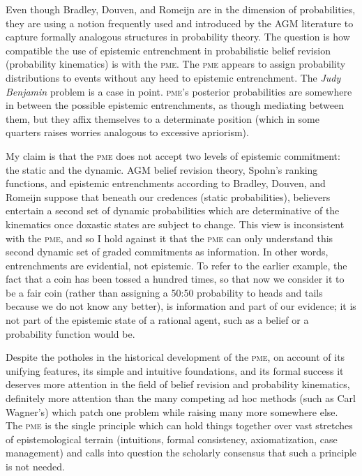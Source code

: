 \documentclass[11pt]{article}
\begin{document}
Even though Bradley, Douven, and Romeijn are in the dimension of
probabilities, they are using a notion frequently used and introduced
by the AGM literature to capture formally analogous structures in
probability theory. The question is how compatible the use of
epistemic entrenchment in probabilistic belief revision (probability
kinematics) is with the \textsc{pme}. The \textsc{pme} appears to
assign probability distributions to events without any heed to
epistemic entrenchment. The \emph{Judy Benjamin} problem is a case in
point. \textsc{pme}'s posterior probabilities are somewhere in between
the possible epistemic entrenchments, as though mediating between
them, but they affix themselves to a determinate position (which in
some quarters raises worries analogous to excessive apriorism).

My claim is that the \textsc{pme} does not accept two levels of
epistemic commitment: the static and the dynamic. AGM belief revision
theory, Spohn's ranking functions, and epistemic entrenchments
according to Bradley, Douven, and Romeijn suppose that beneath our
credences (static probabilities), believers entertain a second set of
dynamic probabilities which are determinative of the kinematics once
doxastic states are subject to change. This view is inconsistent with
the \textsc{pme}, and so I hold against it that the \textsc{pme} can
only understand this second dynamic set of graded commitments as
information. In other words, entrenchments are evidential, not
epistemic. To refer to the earlier example, the fact that a coin has
been tossed a hundred times, so that now we consider it to be a fair
coin (rather than assigning a 50:50 probability to heads and tails
because we do not know any better), is information and part of our
evidence; it is not part of the epistemic state of a rational agent,
such as a belief or a probability function would be.

Despite the potholes in the historical development of the
\textsc{pme}, on account of its unifying features, its simple and
intuitive foundations, and its formal success it deserves more
attention in the field of belief revision and probability kinematics,
definitely more attention than the many competing ad hoc methods (such
as Carl Wagner's) which patch one problem while raising many more
somewhere else. The \textsc{pme} is the single principle which can
hold things together over vast stretches of epistemological terrain
(intuitions, formal consistency, axiomatization, case management) and
calls into question the scholarly consensus that such a principle is
not needed.
\end{document}
